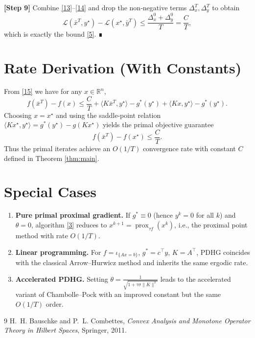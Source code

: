 \documentclass{article}
\newcommand{\prox}{\operatorname{prox}}
\begin{document}
\noindent\textbf{[Step 9]}  Combine \eqref{13}–\eqref{14} and drop the non‑negative terms $\Delta_{x}^{T},\Delta_{y}^{T}$ to obtain
\[
\mathcal L(\bar x^{T},y^{\star})-\mathcal L(x^{\star},\bar y^{T})
\le
\frac{\Delta_{x}^{0}+\Delta_{y}^{0}}{T}
= \frac{C}{T},
\tag{15}
\]
which is exactly the bound \eqref{5}. ∎

\section*{Rate Derivation (With Constants)}
From \eqref{15} we have for any $x\in\mathbb R^{n}$,
\[
f(\bar x^{T})-f(x) \le \frac{C}{T}+ \langle K\bar x^{T},y^{\star}\rangle-g^{*}(y^{\star})+\langle Kx,y^{\star}\rangle-g^{*}(y^{\star}).
\]
Choosing $x=x^{\star}$ and using the saddle‑point relation $\langle Kx^{\star},y^{\star}\rangle=g^{*}(y^{\star})-g(Kx^{\star})$ yields the primal objective guarantee
\[
f(\bar x^{T})-f(x^{\star})\le \frac{C}{T}.
\]
Thus the primal iterates achieve an $O(1/T)$ convergence rate with constant $C$ defined in Theorem \ref{thm:main}.

\section*{Special Cases}
\begin{enumerate}
\item \textbf{Pure primal proximal gradient.} If $g^{*}\equiv0$ (hence $y^{k}=0$ for all $k$) and $\theta=0$, algorithm \eqref{3} reduces to $x^{k+1}=\prox_{\tau f}(x^{k})$, i.e., the proximal point method with rate $O(1/T)$.
\item \textbf{Linear programming.} For $f=\iota_{\{Ax=b\}}$, $g^{*}=c^{\top}y$, $K=A^{\top}$, PDHG coincides with the classical Arrow–Hurwicz method and inherits the same ergodic rate.
\item \textbf{Accelerated PDHG.} Setting $\theta=\frac{1}{\sqrt{1+\tau\sigma\|K\|^{2}}}$ leads to the accelerated variant of Chambolle–Pock with an improved constant but the same $O(1/T)$ order.
\end{enumerate}

\begin{thebibliography}{9}
H.~H. Bauschke and P.~L. Combettes,
\textit{Convex Analysis and Monotone Operator Theory in Hilbert Spaces},
Springer, 2011.
\end{thebibliography}
\end{document}
